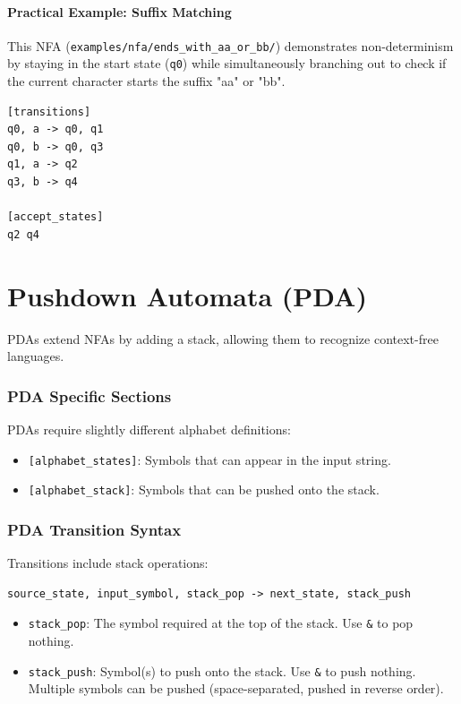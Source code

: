 \documentclass{article}
\begin{document}
\paragraph{Practical Example: Suffix Matching}
This NFA (\texttt{examples/nfa/ends\_with\_aa\_or\_bb/}) demonstrates non-determinism by staying in the start state (\texttt{q0}) while simultaneously branching out to check if the current character starts the suffix "aa" or "bb".
\begin{lstlisting}[caption=NFA matching strings ending in 'aa' or 'bb']
[transitions]
q0, a -> q0, q1
q0, b -> q0, q3
q1, a -> q2
q3, b -> q4

[accept_states]
q2 q4
\end{lstlisting}

\clearpage
\section{Pushdown Automata (PDA)}
PDAs extend NFAs by adding a stack, allowing them to recognize context-free languages.

\subsubsection{PDA Specific Sections}
PDAs require slightly different alphabet definitions:
\begin{itemize}
    \item \texttt{[alphabet\_states]}: Symbols that can appear in the input string.
    \item \texttt{[alphabet\_stack]}: Symbols that can be pushed onto the stack.
\end{itemize}

\subsubsection{PDA Transition Syntax}
Transitions include stack operations:
\begin{lstlisting}
source_state, input_symbol, stack_pop -> next_state, stack_push
\end{lstlisting}

\begin{itemize}
    \item \texttt{stack\_pop}: The symbol required at the top of the stack. Use \texttt{\&} to pop nothing.
    \item \texttt{stack\_push}: Symbol(s) to push onto the stack. Use \texttt{\&} to push nothing. Multiple symbols can be pushed (space-separated, pushed in reverse order).
\end{itemize}
\end{document}
